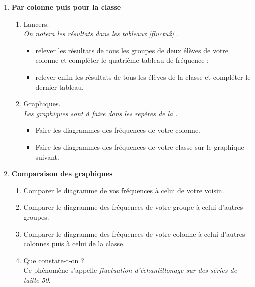 \begin{act}
\begin{enumerate}
\begin{enumerate}
			\end{enumerate}

	\item \textbf{Par colonne puis pour la classe}

		\begin{enumerate}

			\item Lancers. \\ \emph{On notera les r\'esultats dans les tableaux \ref{fluctu2} .}
					\begin{itemize}
						\item relever les r\'esultats de tous les groupes de deux \'el\`eves de votre colonne et compl\'eter le quatri\`eme tableau de fr\'equence ;
						\item relever enfin les r\'esultats de tous les \'el\`eves de la classe et compl\'eter le dernier tableau.
					\end{itemize}





			\item Graphiques.\\ \emph{Les graphiques sont \`a faire dans les rep\`eres de la .}
					\begin{itemize}
							\item Faire les diagrammes des fr\'equences de votre colonne.
							\item Faire les diagrammes des fr\'equences de votre classe sur le graphique suivant.
					\end{itemize}
		\end{enumerate}

	\item \textbf{Comparaison des graphiques}

			\begin{enumerate}
				\item Comparer le diagramme de vos fr\'equences \`a celui de votre voisin.
				\item Comparer le diagramme des fr\'equences de votre groupe \`a celui d'autres groupes.
				\item Comparer le diagramme des fr\'equences de votre colonne \`a celui d'autres colonnes puis \`a celui de la classe.
				\item Que constate-t-on ?\\
				Ce ph\'enom\`ene s'appelle \emph{fluctuation d'\'echantillonage sur des s\'eries de taille 50}.
			\end{enumerate}


\end{enumerate}
\end{act}
